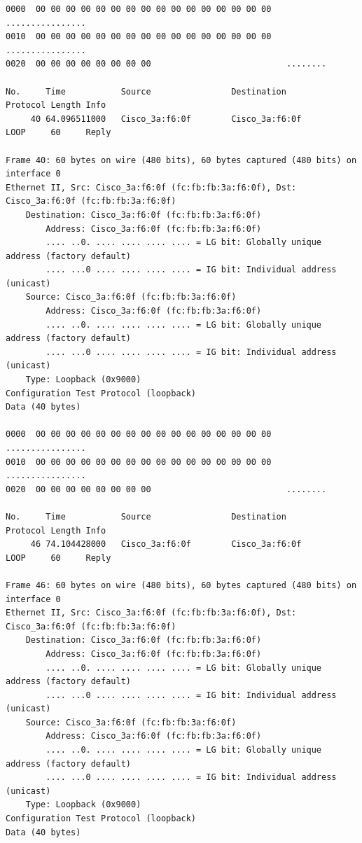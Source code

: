 \documentclass[a4paper,11pt]{article}
\begin{document}
\begin{lstlisting}
0000  00 00 00 00 00 00 00 00 00 00 00 00 00 00 00 00   ................
0010  00 00 00 00 00 00 00 00 00 00 00 00 00 00 00 00   ................
0020  00 00 00 00 00 00 00 00                           ........

No.     Time           Source                Destination           Protocol Length Info
     40 64.096511000   Cisco_3a:f6:0f        Cisco_3a:f6:0f        LOOP     60     Reply

Frame 40: 60 bytes on wire (480 bits), 60 bytes captured (480 bits) on interface 0
Ethernet II, Src: Cisco_3a:f6:0f (fc:fb:fb:3a:f6:0f), Dst: Cisco_3a:f6:0f (fc:fb:fb:3a:f6:0f)
    Destination: Cisco_3a:f6:0f (fc:fb:fb:3a:f6:0f)
        Address: Cisco_3a:f6:0f (fc:fb:fb:3a:f6:0f)
        .... ..0. .... .... .... .... = LG bit: Globally unique address (factory default)
        .... ...0 .... .... .... .... = IG bit: Individual address (unicast)
    Source: Cisco_3a:f6:0f (fc:fb:fb:3a:f6:0f)
        Address: Cisco_3a:f6:0f (fc:fb:fb:3a:f6:0f)
        .... ..0. .... .... .... .... = LG bit: Globally unique address (factory default)
        .... ...0 .... .... .... .... = IG bit: Individual address (unicast)
    Type: Loopback (0x9000)
Configuration Test Protocol (loopback)
Data (40 bytes)

0000  00 00 00 00 00 00 00 00 00 00 00 00 00 00 00 00   ................
0010  00 00 00 00 00 00 00 00 00 00 00 00 00 00 00 00   ................
0020  00 00 00 00 00 00 00 00                           ........

No.     Time           Source                Destination           Protocol Length Info
     46 74.104428000   Cisco_3a:f6:0f        Cisco_3a:f6:0f        LOOP     60     Reply

Frame 46: 60 bytes on wire (480 bits), 60 bytes captured (480 bits) on interface 0
Ethernet II, Src: Cisco_3a:f6:0f (fc:fb:fb:3a:f6:0f), Dst: Cisco_3a:f6:0f (fc:fb:fb:3a:f6:0f)
    Destination: Cisco_3a:f6:0f (fc:fb:fb:3a:f6:0f)
        Address: Cisco_3a:f6:0f (fc:fb:fb:3a:f6:0f)
        .... ..0. .... .... .... .... = LG bit: Globally unique address (factory default)
        .... ...0 .... .... .... .... = IG bit: Individual address (unicast)
    Source: Cisco_3a:f6:0f (fc:fb:fb:3a:f6:0f)
        Address: Cisco_3a:f6:0f (fc:fb:fb:3a:f6:0f)
        .... ..0. .... .... .... .... = LG bit: Globally unique address (factory default)
        .... ...0 .... .... .... .... = IG bit: Individual address (unicast)
    Type: Loopback (0x9000)
Configuration Test Protocol (loopback)
Data (40 bytes)


\end{lstlisting}
\end{document}

